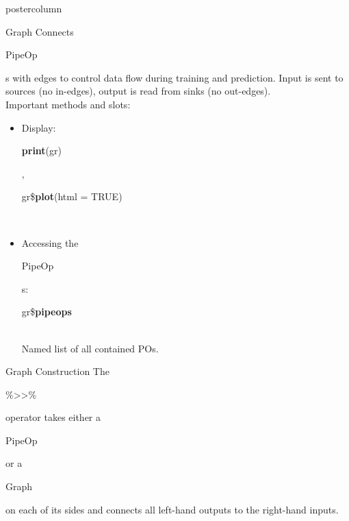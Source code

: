 \documentclass{beamer}
\newlength{\columnheight} %
\newcommand{\codeinline}[1]{\begin{codeboxinline}#1\end{codeboxinline}}
\begin{document}
\begin{frame}[fragile]{}
\begin{columns}
\begin{column}{.245\textwidth}
\begin{beamercolorbox}[center]{postercolumn}
\begin{minipage}{.98\textwidth}
					\parbox[t][\columnheight]{\textwidth}{
						\begin{myblock}{Graph}
              \vspace{-0.5em}
              Connects \codeinline{PipeOp}s with edges to control data flow during training and prediction. Input is sent to sources (no in-edges), output is read from sinks (no out-edges). 
              \ \\
              Important methods and slots:
              \begin{itemize}
                \item Display: \codeinline{\textbf{print}(gr)}, \codeinline{gr\$\textbf{plot}(html = TRUE)}\\
                \item Accessing the \codeinline{PipeOp}s: \codeinline{gr\$\textbf{pipeops}}\\
                Named list of all contained POs.  
            \end{itemize}
            \end{myblock}
            \begin{myblock}{Graph Construction}
                The \codeinline{\%>{}>\%} operator takes either a \codeinline{PipeOp} or a \codeinline{Graph} on each of its sides and connects all left-hand outputs to the right-hand inputs.

\end{myblock}}
\end{minipage}
\end{beamercolorbox}
\end{column}
\end{columns}
\end{frame}
\end{document}
